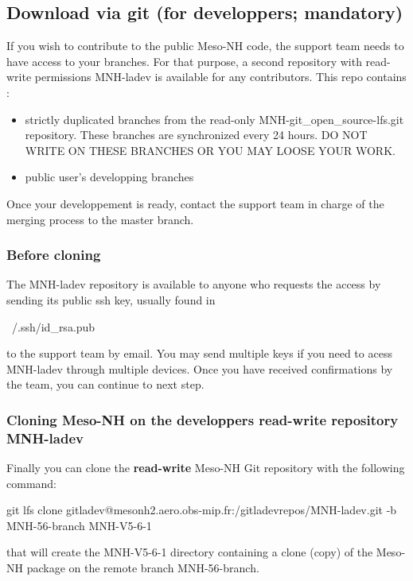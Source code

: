 \subsection{Download via git (for developpers; mandatory)}
\label{sec:dev_sec}
If you wish to contribute to the public Meso-NH code, the support team needs to have access to your branches. For that purpose, a second repository with read-write permissions MNH-ladev is available for any contributors. This repo contains :
\begin{itemize}
    \item strictly duplicated branches from the read-only MNH-git\_open\_source-lfs.git repository. These branches are synchronized every 24 hours. DO NOT WRITE ON THESE BRANCHES OR YOU MAY LOOSE YOUR WORK.
    \item public user's developping branches
\end{itemize}

Once your developpement is ready, contact the support team in charge of the merging process to the master branch.
\subsubsection{Before cloning}
The MNH-ladev repository is available to anyone who requests the access by sending its public ssh key, usually found in 
\begin{bashcode}
    ~/.ssh/id_rsa.pub
\end{bashcode}
to the support team by email. You may send multiple keys if you need to acess MNH-ladev through multiple devices.
Once you have received confirmations by the team, you can continue to next step.

\subsubsection{Cloning Meso-NH on the developpers read-write repository MNH-ladev}
Finally you can clone the \textbf{read-write} Meso-NH Git repository with the following command:
\begin{bashcode}
git lfs clone gitladev@mesonh2.aero.obs-mip.fr:/gitladevrepos/MNH-ladev.git -b MNH-56-branch MNH-V5-6-1
\end{bashcode}

that will create the MNH-V5-6-1 directory containing a clone (copy) of the Meso-NH package on the remote branch MNH-56-branch.

